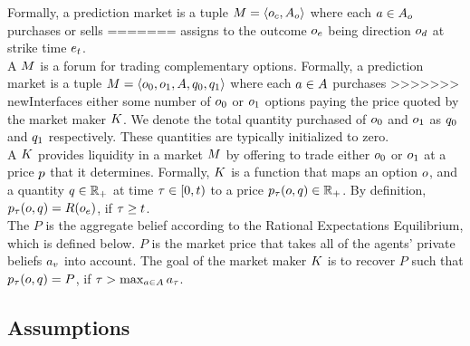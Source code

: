 Formally, a prediction market is a tuple $M = 
\left<o_c, A_o \right>$ where each  
$a\in A_o$ purchases or sells
=======
assigns to the outcome $o_e$ being direction $o_d$
at strike time $e_t$. \\

A  $M$ is a forum for trading complementary options. 
Formally, a prediction market is a tuple $M = 
\left<o_0, o_1, A, {q_0}, {q_1}\right>$ where each  
$a\in A$ purchases 
>>>>>>> newInterfaces
either some number of $o_0$ or $o_1$ options paying the price quoted by the 
market maker $K$. We denote the total quantity purchased of $o_0$ and $o_1$
as ${q_0}$ and ${q_1}$ respectively. These quantities are typically initialized to zero. \\

A  $K$ provides liquidity in a market $M$ by
offering to trade either $o_0$ or $o_1$ at a price $p$ that it determines. 
Formally, $K$ is a function 
that maps an option $o$, 
and a quantity $q\in\mathbb{R}_+$ at time $\tau \in [0,t)$ 
to a price $p_{\tau}(o,q) \in \mathbb{R}_+$. 
By definition, $p_{\tau}(o,q) = R(o_e)$, if 
$\tau \ge t$. \\

The  $P$ is the aggregate belief according to the Rational Expectations Equilibrium, which is defined below. $P$ is the market price that takes all of the agents' private beliefs $a_v$ into account. The goal of the market maker $K$ is to recover $P$ such that $p_{\tau}(o,q) = P$, if $\tau > \max_{a \in A} a_\tau$. \\


\subsection{Assumptions}


